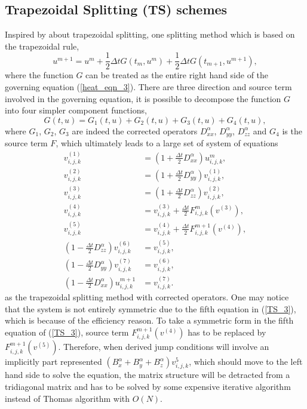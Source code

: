 \documentclass[dissertation]{uathesis}
\begin{document}
\begin{body}
\begin{flushleft}
\subsection{Trapezoidal Splitting (TS) schemes}
\hspace{1cm} Inspired by \cite{hundsdorfer1998trapezoidal} about trapezoidal splitting, one splitting method which is based on the trapezoidal rule,
%
\begin{equation} \label{Trapezoidal_rule_3}
u^{m+1} = u^{m} + \frac{1}{2} \Delta t G(t_m, u^m) + \frac{1}{2} \Delta t G(t_{m+1}, u^{m+1}), 
\end{equation}
%
where the function $G$ can be treated as the entire right hand side of the governing equation (\ref{heat_eqn_3}). There are three direction and source term involved in the governing equation, it is possible to decompose the function $G$ into four simpler component functions, 
%
\begin{equation} \label{decompose_G_3}
G(t, u) = G_1(t, u) + G_2(t, u) + G_3(t, u) + G_4(t, u), 
\end{equation}
%
where $G_1$, $G_2$, $G_3$ are indeed the corrected operators $D^{\alpha}_{xx}$, $D^{\alpha}_{yy}$, $D^{\alpha}_{zz}$ and $G_4$ is the source term $F$, which ultimately leads to a large set of system of equations
%
\begin{align} \label{TS_3}
v^{(1)}_{i,j,k} &= (1+\frac{\Delta t}{2} D^{\alpha}_{xx})u^{m}_{i,j,k}, \nonumber \\
v^{(2)}_{i,j,k} &= (1+\frac{\Delta t}{2} D^{\alpha}_{yy})v^{(1)}_{i,j,k}, \nonumber \\
v^{(3)}_{i,j,k} &= (1+\frac{\Delta t}{2} D^{\alpha}_{zz})v^{(2)}_{i,j,k}, \nonumber \\
v^{(4)}_{i,j,k} &= v^{(3)}_{i,j,k} + \frac{\Delta t}{2} F^{m}_{i,j,k}(v^{(3)}), \nonumber \\
v^{(5)}_{i,j,k} &= v^{(4)}_{i,j,k} + \frac{\Delta t}{2} F^{m+1}_{i,j,k}(v^{(4)}), \\
(1-\frac{\Delta t}{2} D^{\alpha}_{zz})v^{(6)}_{i,j,k} &= v^{(5)}_{i,j,k}, \nonumber \\
(1-\frac{\Delta t}{2} D^{\alpha}_{yy})v^{(7)}_{i,j,k} &= v^{(6)}_{i,j,k}, \nonumber \\
(1-\frac{\Delta t}{2} D^{\alpha}_{xx})u^{m+1}_{i,j,k} &= v^{(7)}_{i,j,k}. \nonumber
\end{align}
%
as the trapezoidal splitting method with corrected operators. One may notice that the system is not entirely symmetric due to the fifth equation in (\ref{TS_3}), which is because of the efficiency reason. To take a symmetric form in the fifth equation of (\ref{TS_3}), source term $F^{m+1}_{i,j,k}(v^{(4)})$ has to be replaced by $F^{m+1}_{i,j,k}(v^{(5)})$. Therefore, when derived jump conditions will involve an implicitly part represented $(B^{\alpha}_{x}+B^{\alpha}_{y}+B^{\alpha}_{z})v^{5}_{i,j,k}$, which should move to the left hand side to solve the equation, the matrix structure will be detracted from a tridiagonal matrix and has to be solved by some expensive iterative algorithm instead of Thomas algorithm with $O(N)$.


\end{flushleft}
\end{body}
\end{document}
